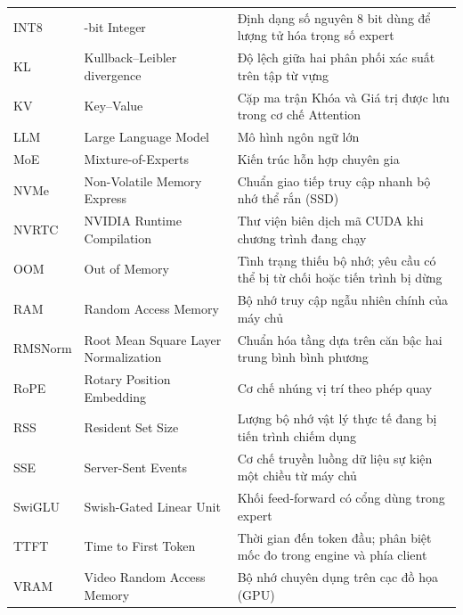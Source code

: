 \begin{longtable}{@{}>{\RaggedRight\arraybackslash}p{2.2cm} >{\RaggedRight\arraybackslash}p{4.4cm} >{\RaggedRight\arraybackslash}p{8.5cm}@{}}
INT8 & 8-bit Integer & Định dạng số nguyên 8 bit dùng để lượng tử hóa trọng số expert \\
KL & Kullback--Leibler divergence & Độ lệch giữa hai phân phối xác suất trên tập từ vựng \\
KV & Key--Value & Cặp ma trận Khóa và Giá trị được lưu trong cơ chế Attention \\
LLM & Large Language Model & Mô hình ngôn ngữ lớn \\
MoE & Mixture-of-Experts & Kiến trúc hỗn hợp chuyên gia \\
NVMe & Non-Volatile Memory Express & Chuẩn giao tiếp truy cập nhanh bộ nhớ thể rắn (SSD) \\
NVRTC & NVIDIA Runtime Compilation & Thư viện biên dịch mã CUDA khi chương trình đang chạy \\
OOM & Out of Memory & Tình trạng thiếu bộ nhớ; yêu cầu có thể bị từ chối hoặc tiến trình bị dừng \\
RAM & Random Access Memory & Bộ nhớ truy cập ngẫu nhiên chính của máy chủ \\
RMSNorm & Root Mean Square Layer Normalization & Chuẩn hóa tầng dựa trên căn bậc hai trung bình bình phương \\
RoPE & Rotary Position Embedding & Cơ chế nhúng vị trí theo phép quay \\
RSS & Resident Set Size & Lượng bộ nhớ vật lý thực tế đang bị tiến trình chiếm dụng \\
SSE & Server-Sent Events & Cơ chế truyền luồng dữ liệu sự kiện một chiều từ máy chủ \\
SwiGLU & Swish-Gated Linear Unit & Khối feed-forward có cổng dùng trong expert \\
TTFT & Time to First Token & Thời gian đến token đầu; phân biệt mốc đo trong engine và phía client \\
VRAM & Video Random Access Memory & Bộ nhớ chuyên dụng trên cạc đồ họa (GPU) \\
\end{longtable}

